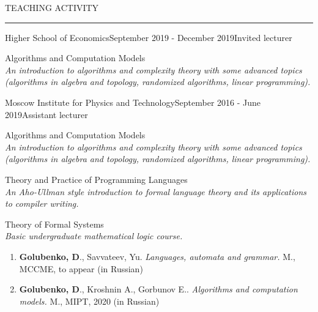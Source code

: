 \documentclass{resume} %
\renewenvironment{rSection}[1]{
\sectionskip
\textcolor{RoyalPurple}{\MakeUppercase{#1}}
\sectionlineskip
\hrule
\begin{list}{}{
\setlength{\leftmargin}{1.5em}
}
\item[]
}{
\end{list}
}
\begin{document}
\begin{rSection}{Teaching Activity}

\begin{rSubsection}{Higher School of Economics}{September 2019 - December 2019}{Invited lecturer}{}
\item \normalsize{Algorithms and Computation Models} \\ \small{\emph{An introduction to algorithms and complexity theory with some advanced topics (algorithms in algebra and topology, randomized algorithms, linear programming).}}
\end{rSubsection}

\begin{rSubsection}{Moscow Institute for Physics and Technology}{September 2016 - June 2019}{Assistant lecturer}{}
\item \normalsize{Algorithms and Computation Models} \\ \small{\emph{An introduction to algorithms and complexity theory with some advanced topics (algorithms in algebra and topology, randomized algorithms, linear programming).}}
\item \normalsize{Theory and Practice of Programming Languages} \\ \small{\emph{An Aho-Ullman style introduction to formal language theory and its applications to compiler writing.}}
\item \normalsize{Theory of Formal Systems} \\ \small{\emph{Basic undergraduate mathematical logic course.}}
\end{rSubsection}

\begin{enumerate}
  \leftskip-0.13in %
  \item \textbf{Golubenko, D}., Savvateev, Yu. \textit{Languages, automata and grammar.} M., MCCME, to appear (in Russian)
  
  \item \textbf{Golubenko, D}., Kroshnin A., Gorbunov E.. \textit{Algorithms and computation models.} M., MIPT, 2020 (in Russian)

\end{enumerate}

\end{rSection}

\end{document}
